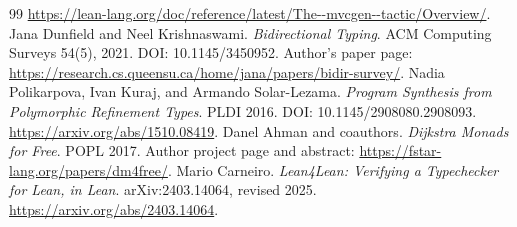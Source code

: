 \documentclass[11pt,a4paper]{article}
\theoremstyle{definition}\newtheorem{definition}[theorem]{Definition}
\theoremstyle{remark}\newtheorem{remark}[theorem]{Remark}
\begin{document}
\begin{thebibliography}{99}
\url{https://lean-lang.org/doc/reference/latest/The--mvcgen--tactic/Overview/}.
 Jana Dunfield and Neel Krishnaswami. \emph{Bidirectional Typing}. ACM Computing Surveys 54(5), 2021. DOI: 10.1145/3450952. Author's paper page:\newline
\url{https://research.cs.queensu.ca/home/jana/papers/bidir-survey/}.
 Nadia Polikarpova, Ivan Kuraj, and Armando Solar-Lezama. \emph{Program Synthesis from Polymorphic Refinement Types}. PLDI 2016. DOI: 10.1145/2908080.2908093.\newline
\url{https://arxiv.org/abs/1510.08419}.
 Danel Ahman and coauthors. \emph{Dijkstra Monads for Free}. POPL 2017. Author project page and abstract:\newline
\url{https://fstar-lang.org/papers/dm4free/}.
 Mario Carneiro. \emph{Lean4Lean: Verifying a Typechecker for Lean, in Lean}. arXiv:2403.14064, revised 2025.\newline
\url{https://arxiv.org/abs/2403.14064}.
\end{thebibliography}
\endgroup
\end{document}
